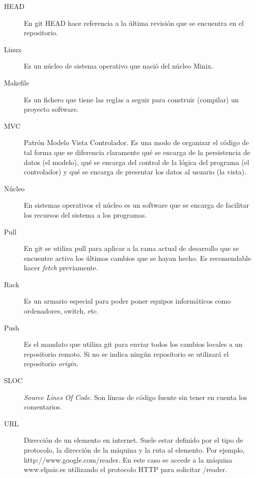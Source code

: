 \begin{description}
	\item[HEAD] En git HEAD hace referencia a la última revisión que se encuentra en el repositorio.

	\item[Linux] Es un núcleo de sistema operativo que nació del núcleo Minix.
	
	\item[Makefile] Es un fichero que tiene las reglas a seguir para construir (compilar) un proyecto software.
	
	\item[MVC] Patrón Modelo Vista Controlador. Es una modo de organizar el código de tal forma que se diferencia claramente qué se encarga de la persistencia de datos (el modelo), qué se encarga del control de la lógica del programa (el controlador) y qué se encarga de presentar los datos al usuario (la vista).
	
	\item[Núcleo] En sistemas operativos el núcleo es un software que se encarga de facilitar los recursos del sistema a los programas.
	
	\item[Pull] En git se utiliza pull para aplicar a la rama actual de desarrollo que se encuentre activa los últimos cambios que se hayan hecho. Es recomendable hacer \emph{fetch} previamente.
	
	\item[Rack] Es un armario especial para poder poner equipos informáticos como ordenadores, switch, etc.
	
	\item[Push] Es el mandato que utiliza git para enviar todos los cambios locales a un repositorio remoto. Si no se indica ningún repositorio se utilizará el repositorio \emph{origin}.
	
	\item[SLOC] \emph{Source Lines Of Code}. Son líneas de código fuente sin tener en cuenta los comentarios.
	
	\item[URL] Dirección de un elemento en internet. Suele estar definido por el tipo de protocolo, la dirección de la máquina y la ruta al elemento. Por ejemplo, http://www.google.com/reader. En este caso se accede a la máquina www.elpais.es utilizando el protocolo HTTP para solicitar /reader.
\end{description}
